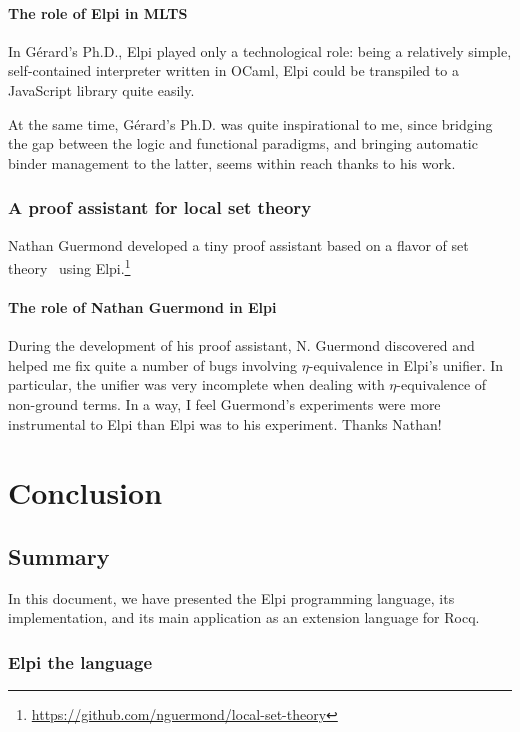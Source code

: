 \documentclass[a4paper, 11pt]{book}
\begin{document}
\subsubsection{The role of Elpi in MLTS}

In G\'{e}rard's Ph.D., Elpi played only a technological role: being a
relatively simple, self-contained interpreter written in OCaml, Elpi could be
transpiled to a JavaScript library quite easily.

At the same time, G\'{e}rard's Ph.D. was quite inspirational to me, since
bridging the gap between the logic and functional paradigms, and bringing
automatic binder management to the latter, seems within reach thanks to his
work.


\subsection{A proof assistant for local set theory}

Nathan Guermond developed a tiny proof assistant based on a flavor of set
theory~\cite{https://doi.org/10.1112/blms/22.1.101} using
Elpi.\footnote{\url{https://github.com/nguermond/local-set-theory}}


\subsubsection{The role of Nathan Guermond in Elpi}

During the development of his proof assistant, N. Guermond discovered and
helped me fix quite a number of bugs involving $\eta$-equivalence in Elpi's
unifier. In particular, the unifier was very incomplete when dealing with
$\eta$-equivalence of non-ground terms. In a way, I feel Guermond's
experiments were more instrumental to Elpi than Elpi was to his experiment.
Thanks Nathan!

\chapter{Conclusion}

\section{Summary}


In this document, we have presented the Elpi programming language, its
implementation, and its main application as an extension language for Rocq.

\subsection{Elpi the language}
\end{document}
